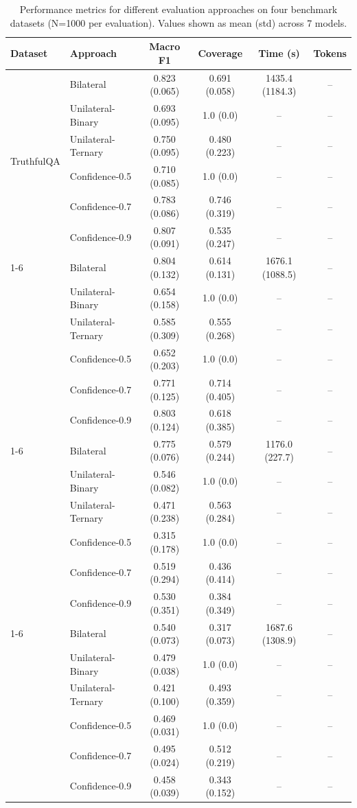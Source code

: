 \documentclass{article}
\begin{document}
\begin{table}[htbp]
\centering
\caption{Performance metrics for different evaluation approaches on four benchmark datasets (N=1000 per evaluation). Values shown as mean (std) across 7 models.}
\label{tab:comparative_performance}
\begin{tabular}{llcccc}
\toprule
\textbf{Dataset} & \textbf{Approach} & \textbf{Macro F1} & \textbf{Coverage} & \textbf{Time (s)} & \textbf{Tokens} \\
\midrule
\multirow{6}{*}{TruthfulQA} 
 & Bilateral & 0.823 (0.065) & 0.691 (0.058) & 1435.4 (1184.3) & -- \\
 & Unilateral-Binary & 0.693 (0.095) & 1.0 (0.0) & -- & -- \\
 & Unilateral-Ternary & 0.750 (0.095) & 0.480 (0.223) & -- & -- \\
 & Confidence-0.5 & 0.710 (0.085) & 1.0 (0.0) & -- & -- \\
 & Confidence-0.7 & 0.783 (0.086) & 0.746 (0.319) & -- & -- \\
 & Confidence-0.9 & 0.807 (0.091) & 0.535 (0.247) & -- & -- \\
\cline{1-6}
\multirow{6}{*}{SimpleQA} 
 & Bilateral & 0.804 (0.132) & 0.614 (0.131) & 1676.1 (1088.5) & -- \\
 & Unilateral-Binary & 0.654 (0.158) & 1.0 (0.0) & -- & -- \\
 & Unilateral-Ternary & 0.585 (0.309) & 0.555 (0.268) & -- & -- \\
 & Confidence-0.5 & 0.652 (0.203) & 1.0 (0.0) & -- & -- \\
 & Confidence-0.7 & 0.771 (0.125) & 0.714 (0.405) & -- & -- \\
 & Confidence-0.9 & 0.803 (0.124) & 0.618 (0.385) & -- & -- \\
\cline{1-6}
\multirow{6}{*}{MMLU-Pro} 
 & Bilateral & 0.775 (0.076) & 0.579 (0.244) & 1176.0 (227.7) & -- \\
 & Unilateral-Binary & 0.546 (0.082) & 1.0 (0.0) & -- & -- \\
 & Unilateral-Ternary & 0.471 (0.238) & 0.563 (0.284) & -- & -- \\
 & Confidence-0.5 & 0.315 (0.178) & 1.0 (0.0) & -- & -- \\
 & Confidence-0.7 & 0.519 (0.294) & 0.436 (0.414) & -- & -- \\
 & Confidence-0.9 & 0.530 (0.351) & 0.384 (0.349) & -- & -- \\
\cline{1-6}
\multirow{6}{*}{FACTScore} 
 & Bilateral & 0.540 (0.073) & 0.317 (0.073) & 1687.6 (1308.9) & -- \\
 & Unilateral-Binary & 0.479 (0.038) & 1.0 (0.0) & -- & -- \\
 & Unilateral-Ternary & 0.421 (0.100) & 0.493 (0.359) & -- & -- \\
 & Confidence-0.5 & 0.469 (0.031) & 1.0 (0.0) & -- & -- \\
 & Confidence-0.7 & 0.495 (0.024) & 0.512 (0.219) & -- & -- \\
 & Confidence-0.9 & 0.458 (0.039) & 0.343 (0.152) & -- & -- \\
\bottomrule
\end{tabular}
\end{table}
\end{document}
